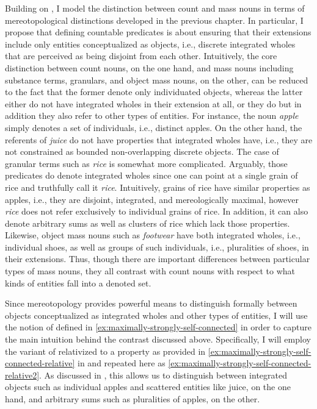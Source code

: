 	Building on \citet{grimm2012number}, I model the distinction between count and mass nouns in terms of mereotopological distinctions developed in the previous chapter. In particular, I propose that defining countable predicates is about ensuring that their extensions include only entities conceptualized as objects, i.e., discrete integrated wholes that are perceived as being disjoint from each other. Intuitively, the core distinction between count nouns, on the one hand, and mass nouns including substance terms, granulars, and object mass nouns, on the other, can be reduced to the fact that the former denote only individuated objects, whereas the latter either do not have integrated wholes in their extension at all, or they do but in addition they also refer to other types of entities. For instance, the noun \textit{apple} simply denotes a set of individuals, i.e., distinct apples. On the other hand, the referents of \textit{juice} do not have properties that integrated wholes have, i.e., they are not constrained as bounded non-overlapping discrete objects. The case of granular terms such as \textit{rice} is somewhat more complicated. Arguably, those predicates do denote integrated wholes since one can point at a single grain of rice and truthfully call it \textit{rice}. Intuitively, grains of rice have similar properties as apples, i.e., they are disjoint, integrated, and mereologically maximal, however \textit{rice} does not refer exclusively to individual grains of rice. In addition, it can also denote arbitrary sums as well as clusters of rice which lack those properties. Likewise, object mass nouns such as \textit{footwear} have both integrated wholes, i.e., individual shoes, as well as groups of such individuals, i.e., pluralities of shoes, in their extensions. Thus, though there are important differences between particular types of mass nouns, they all contrast with count nouns with respect to what kinds of entities fall into a denoted set.
	
	\begin{sloppypar}
	Since mereotopology provides powerful means to distinguish formally between objects conceptualized as integrated wholes and other types of entities, I will use the notion of  defined in \ref{ex:maximally-strongly-self-connected} in order to capture the main intuition behind the contrast discussed above. Specifically, I will employ the variant of  relativized to a property as provided in \ref{ex:maximally-strongly-self-connected-relative} in  and repeated here as \ref{ex:maximally-strongly-self-connected-relative2}. As discussed in  , this allows us to distinguish between integrated objects such as individual apples and scattered entities like juice, on the one hand, and arbitrary sums such as pluralities of apples, on the other.
	\end{sloppypar}
	
